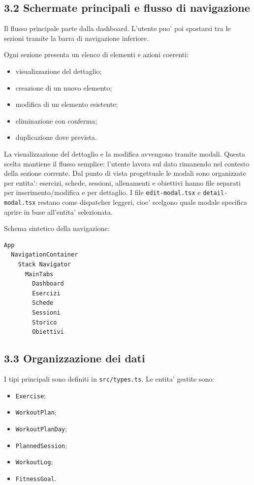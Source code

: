 \documentclass[11pt,a4paper]{article}
\begin{document}
\subsection{3.2 Schermate principali e flusso di navigazione}

Il flusso principale parte dalla dashboard. L'utente puo' poi spostarsi tra le sezioni tramite la barra di navigazione inferiore.

Ogni sezione presenta un elenco di elementi e azioni coerenti:

\begin{itemize}
  \item visualizzazione del dettaglio;
  \item creazione di un nuovo elemento;
  \item modifica di un elemento esistente;
  \item eliminazione con conferma;
  \item duplicazione dove prevista.
\end{itemize}

La visualizzazione del dettaglio e la modifica avvengono tramite modali. Questa scelta mantiene il flusso semplice: l'utente lavora sul dato rimanendo nel contesto della sezione corrente. Dal punto di vista progettuale le modali sono organizzate per entita': esercizi, schede, sessioni, allenamenti e obiettivi hanno file separati per inserimento/modifica e per dettaglio. I file \texttt{edit-modal.tsx} e \texttt{detail-modal.tsx} restano come dispatcher leggeri, cioe' scelgono quale modale specifica aprire in base all'entita' selezionata.

Schema sintetico della navigazione:

\begin{lstlisting}
App
  NavigationContainer
    Stack Navigator
      MainTabs
        Dashboard
        Esercizi
        Schede
        Sessioni
        Storico
        Obiettivi
\end{lstlisting}

\subsection{3.3 Organizzazione dei dati}

I tipi principali sono definiti in \texttt{src/types.ts}. Le entita' gestite sono:

\begin{itemize}
  \item \texttt{Exercise};
  \item \texttt{WorkoutPlan};
  \item \texttt{WorkoutPlanDay};
  \item \texttt{PlannedSession};
  \item \texttt{WorkoutLog};
  \item \texttt{FitnessGoal}.
\end{itemize}
\end{document}
